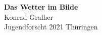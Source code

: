 \begin{titlepage}
    \begin{center}
        \huge{
            \vspace*{1cm}
            \textbf{Das Wetter im Bilde}
        }
        \vspace{1cm}
        \\
        \large{
            Konrad Gralher \\
            Jugendforscht 2021 Thüringen 
        }
        \vfill
        \tableofcontents{}
        
    \end{center}
\end{titlepage}
